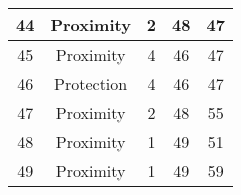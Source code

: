 \documentclass[results.tex]{subfiles}
\begin{document}
\begin{center}
\begin{tabular}{| c || c | c | c | c |}
            \hline
            44                      & Proximity                    & 2                      & 48                      & 47                   \\
            \hline
            45                      & Proximity                    & 4                      & 46                      & 47                   \\
            \hline
            46                      & Protection                   & 4                      & 46                      & 47                   \\
            \hline
            47                      & Proximity                    & 2                      & 48                      & 55                   \\
            \hline
            48                      & Proximity                    & 1                      & 49                      & 51                   \\
            \hline
            49                      & Proximity                    & 1                      & 49                      & 59                   \\
            \hline
        \end{tabular}
    \end{center}
\end{document}
